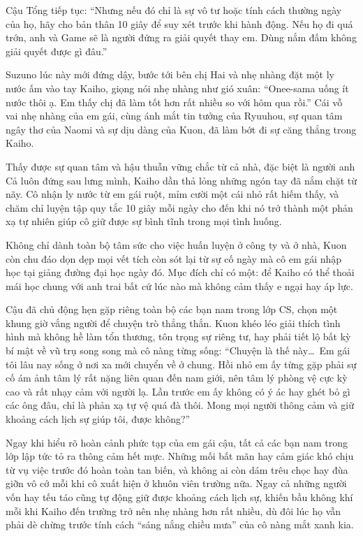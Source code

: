 \documentclass[../main.tex]{subfiles}
\begin{document}
Cậu Tổng tiếp tục: ``Nhưng nếu đó chỉ là sự vô tư hoặc tính cách thường ngày của họ, hãy cho bản thân 10 giây để suy xét trước khi hành động. Nếu họ đi quá trớn, anh và Game sẽ là người đứng ra giải quyết thay em. Dùng nắm đấm không giải quyết được gì đâu.''

Suzuno lúc này mới đứng dậy, bước tới bên chị Hai và nhẹ nhàng đặt một ly nước ấm vào tay Kaiho, giọng nói nhẹ nhàng như gió xuân: ``Onee-sama uống ít nước thôi ạ. Em thấy chị đã làm tốt hơn rất nhiều so với hôm qua rồi.'' Cái vỗ vai nhẹ nhàng của em gái, cùng ánh mắt tin tưởng của Ryuuhou, sự quan tâm ngây thơ của Naomi và sự dịu dàng của Kuon, đã làm bớt đi sự căng thẳng trong Kaiho.

Thấy được sự quan tâm và hậu thuẫn vững chắc từ cả nhà, đặc biệt là người anh Cả luôn đứng sau lưng mình, Kaiho dần thả lỏng những ngón tay đã nắm chặt từ nãy. Cô nhận ly nước từ em gái ruột, mỉm cười một cái nhỏ rất hiếm thấy, và chăm chỉ luyện tập quy tắc 10 giây mỗi ngày cho đến khi nó trở thành một phản xạ tự nhiên giúp cô giữ được sự bình tĩnh trong mọi tình huống.

\ct

Không chỉ dành toàn bộ tâm sức cho việc huấn luyện ở công ty và ở nhà, Kuon còn chu đáo dọn dẹp mọi vết tích còn sót lại từ sự cố ngày mà cô em gái nhập học tại giảng đường đại học ngày đó. Mục đích chỉ có một: để Kaiho có thể thoải mái học chung với anh trai bất cứ lúc nào mà không cảm thấy e ngại hay áp lực.

Cậu đã chủ động hẹn gặp riêng toàn bộ các bạn nam trong lớp CS, chọn một khung giờ vắng người để chuyện trò thẳng thắn. Kuon khéo léo giải thích tình hình mà không hề làm tổn thương, tôn trọng sự riêng tư, hay phải tiết lộ bất kỳ bí mật về vũ trụ song song mà cô nàng từng sống: ``Chuyện là thế này\dots\ Em gái tôi lâu nay sống ở nơi xa mới chuyển về ở chung. Hồi nhỏ em ấy từng gặp phải sự cố ám ảnh tâm lý rất nặng liên quan đến nam giới, nên tâm lý phòng vệ cực kỳ cao và rất nhạy cảm với người lạ. Lần trước em ấy không có ý ác hay ghét bỏ gì các ông đâu, chỉ là phản xạ tự vệ quá đà thôi. Mong mọi người thông cảm và giữ khoảng cách lịch sự giúp tôi, được không?''

Ngay khi hiểu rõ hoàn cảnh phức tạp của em gái cậu, tất cả các bạn nam trong lớp lập tức tỏ ra thông cảm hết mực. Những mối bất mãn hay cảm giác khó chịu từ vụ việc trước đó hoàn toàn tan biến, và không ai còn dám trêu chọc hay đùa giỡn vô cớ mỗi khi cô xuất hiện ở khuôn viên trường nữa. Ngay cả những người vốn hay tếu táo cũng tự động giữ được khoảng cách lịch sự, khiến bầu không khí mỗi khi Kaiho đến trường trở nên nhẹ nhàng hơn rất nhiều, dù đôi lúc họ vẫn phải dè chừng trước tính cách ``sáng nắng chiều mưa'' của cô nàng mắt xanh kia.
\end{document}
